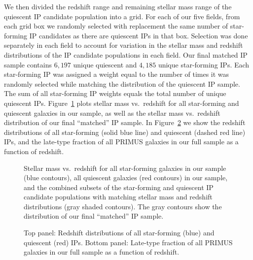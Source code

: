 We then divided the redshift range and remaining stellar mass range of the quiescent IP candidate population into a grid.
For each of our five fields, from each grid box we randomly selected with replacement the same number of star-forming IP candidates as there are quiescent IPs in that box.
Selection was done separately in each field to account for variation in the stellar mass and redshift distributions of the IP candidate populations in each field.
Our final matched IP sample contains $6,197$ unique quiescent and $4,185$ unique star-forming IPs.
Each star-forming IP was assigned a weight equal to the number of times it was randomly selected while matching the distribution of the quiescent IP sample.
The sum of all star-forming IP weights equals the total number of unique quiescent IPs.
Figure~\ref{fig:IPsample_matched} plots stellar mass vs.~redshift for all star-forming and quiescent galaxies in our sample, 
as well as the stellar mass vs.~redshift distribution of our final ``matched'' IP sample.
In Figure~\ref{fig:IPhist_latefrac_vs_z} we show the redshift distributions of all star-forming (solid blue line) and quiescent (dashed red line) IPs, and the late-type fraction of all PRIMUS galaxies in our full sample as a function of redshift.

\begin{figure}
  \epstrim{0.4in 0.2in 0.2in 0.4in}
  \caption{Stellar mass vs.~redshift for all star-forming galaxies in our sample (blue contours), all quiescent galaxies (red contours) in our sample, and the combined subsets of the star-forming and quiescent IP candidate populations with matching stellar mass and redshift distributions (gray shaded contours).
The gray contours show the distribution of our final ``matched'' IP sample.
}
  \label{fig:IPsample_matched}
\end{figure}

\begin{figure}
  \epstrim{0.1in 0.1in 0.5in 0.8in}
  \caption{Top panel: Redshift distributions of all star-forming (blue) and quiescent (red) IPs.
Bottom panel: Late-type fraction of all PRIMUS galaxies in our full sample as a function of redshift.
}
  \label{fig:IPhist_latefrac_vs_z}
\end{figure}


